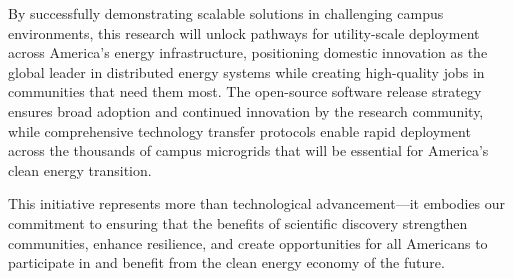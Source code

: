 \documentclass[12pt]{article}
\begin{document}
By successfully demonstrating scalable solutions in challenging campus environments, this research will unlock pathways for utility-scale deployment across America's energy infrastructure, positioning domestic innovation as the global leader in distributed energy systems while creating high-quality jobs in communities that need them most. The open-source software release strategy ensures broad adoption and continued innovation by the research community, while comprehensive technology transfer protocols enable rapid deployment across the thousands of campus microgrids that will be essential for America's clean energy transition.

This initiative represents more than technological advancement---it embodies our commitment to ensuring that the benefits of scientific discovery strengthen communities, enhance resilience, and create opportunities for all Americans to participate in and benefit from the clean energy economy of the future.




\end{document}
